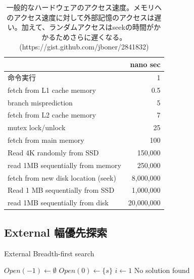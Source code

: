\documentclass[b5paper]{report}
\begin{document}
\begin{table}
\centering
\caption{一般的なハードウェアのアクセス速度。メモリへのアクセス速度に対して外部記憶のアクセスは遅い。加えて、ランダムアクセスはseekの時間がかかるためさらに遅くなる。 (https://gist.github.com/jboner/2841832)}
\label{tbl:latency}
\begin{adjustbox}{width=\textwidth}
\begin{tabular}{|l|r|}
		   & nano sec \\ \hline
	命令実行 & 1 \\
	fetch from L1 cache memory & 0.5 \\
	branch misprediction 		& 5 \\
	fetch from L2 cache memory & 7 \\
	mutex lock/unlock  			& 25 \\
	fetch from main memory  	& 100 \\
	Read 4K randomly from SSD         & 150,000 \\
	read 1MB sequentially from memory & 250,000 \\
	fetch from new disk location (seek) & 8,000,000 \\
	Read 1 MB sequentially from SSD		& 1,000,000 \\
	read 1MB sequentially from disk 	& 20,000,000 \\
	
\end{tabular}
\end{adjustbox}
\end{table}

\subsection{External 幅優先探索}
\label{sec:external-brfs}


\begin{algorithm}
\caption{External Breadth-first search}
\label{alg:external-brfs}
	$Open(-1) \leftarrow \emptyset$\;
	$Open(0) \leftarrow \{s\}$\;
	$i \leftarrow 1$\;
	\Return No solution found
\end{algorithm}
\end{document}
